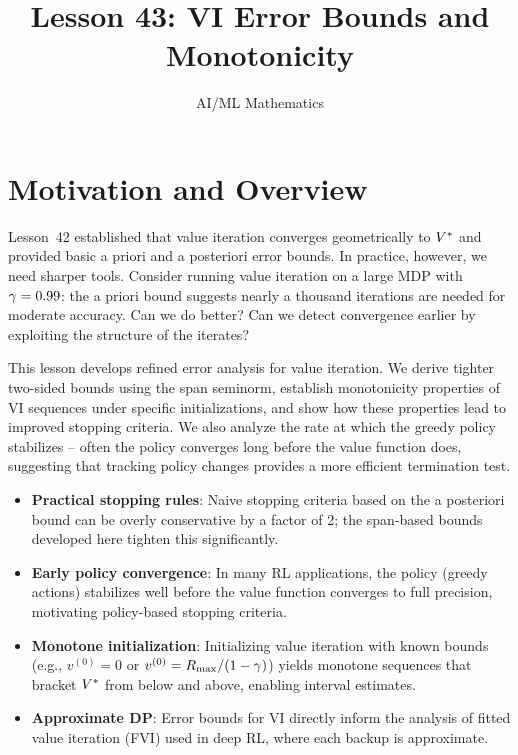 \documentclass[11pt,a4paper]{article}
\title{Lesson 43: VI Error Bounds and Monotonicity}
\author{AI/ML Mathematics}
\date{}
\begin{document}
\maketitle
\tableofcontents
\newpage


\section{Motivation and Overview}
\label{sec:motivation}

Lesson~42 established that value iteration converges geometrically to
$V^*$ and provided basic a priori and a posteriori error bounds.
In practice, however, we need sharper tools. Consider running value
iteration on a large MDP with $\gamma = 0.99$: the a priori bound
suggests nearly a thousand iterations are needed for moderate
accuracy. Can we do better? Can we detect convergence earlier by
exploiting the structure of the iterates?

This lesson develops refined error analysis for value iteration. We
derive tighter two-sided bounds using the span seminorm, establish
monotonicity properties of VI sequences under specific initializations,
and show how these properties lead to improved stopping criteria. We
also analyze the rate at which the greedy policy stabilizes -- often
the policy converges long before the value function does, suggesting
that tracking policy changes provides a more efficient termination
test.

\begin{rlconnection}[title={Why Refined VI Analysis Matters for RL/ML}]
\begin{itemize}[nosep]
    \item \textbf{Practical stopping rules}: Naive stopping criteria
    based on the a posteriori bound can be overly conservative by a
    factor of 2; the span-based bounds developed here tighten this
    significantly.
    \item \textbf{Early policy convergence}: In many RL applications,
    the policy (greedy actions) stabilizes well before the value
    function converges to full precision, motivating policy-based
    stopping criteria.
    \item \textbf{Monotone initialization}: Initializing value
    iteration with known bounds (e.g., $v^{(0)} = 0$ or
    $v^{(0)} = R_{\max}/(1-\gamma)$) yields monotone sequences
    that bracket $V^*$ from below and above, enabling interval
    estimates.
    \item \textbf{Approximate DP}: Error bounds for VI directly inform
    the analysis of fitted value iteration (FVI) used in deep RL,
    where each backup is approximate.
\end{itemize}
\end{rlconnection}
\end{document}
